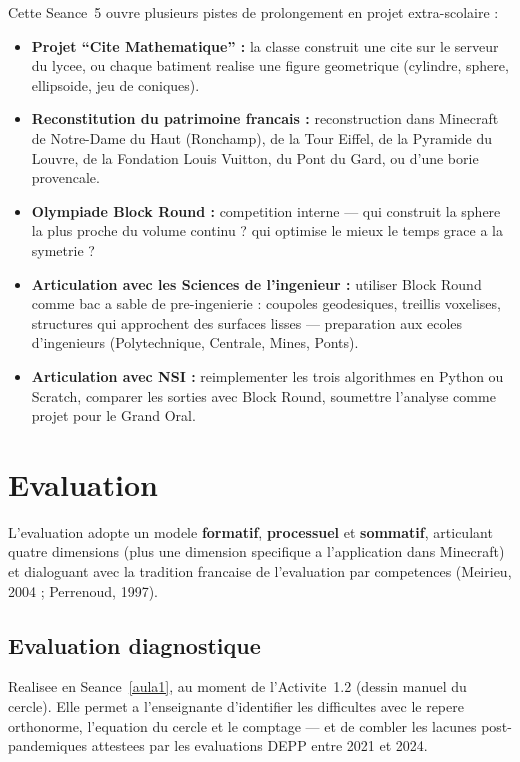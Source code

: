 \documentclass[12pt,a4paper]{scrartcl}
\newcommand{\acc}[1]{\textcolor{accent}{\textbf{#1}}}
\begin{document}
\begin{minecraft}
Cette Seance~5 ouvre plusieurs pistes de prolongement en projet extra-scolaire :
\begin{itemize}[leftmargin=1.3em,itemsep=0.15em,topsep=0.3em,nosep]
  \item \textbf{Projet \enquote{Cite Mathematique} :} la classe construit une cite sur le serveur du lycee, ou chaque batiment realise une figure geometrique (cylindre, sphere, ellipsoide, jeu de coniques).
  \item \textbf{Reconstitution du patrimoine francais :} reconstruction dans Minecraft de Notre-Dame du Haut (Ronchamp), de la Tour Eiffel, de la Pyramide du Louvre, de la Fondation Louis Vuitton, du Pont du Gard, ou d'une borie provencale.
  \item \textbf{Olympiade Block Round :} competition interne --- qui construit la sphere la plus proche du volume continu ? qui optimise le mieux le temps grace a la symetrie ?
  \item \textbf{Articulation avec les Sciences de l'ingenieur :} utiliser Block Round comme bac a sable de pre-ingenierie : coupoles geodesiques, treillis voxelises, structures qui approchent des surfaces lisses --- preparation aux ecoles d'ingenieurs (Polytechnique, Centrale, Mines, Ponts).
  \item \textbf{Articulation avec NSI :} reimplementer les trois algorithmes en Python ou Scratch, comparer les sorties avec Block Round, soumettre l'analyse comme projet pour le Grand Oral.
\end{itemize}
\end{minecraft}


\section{Evaluation}\label{sec:avaliacao}

L'evaluation adopte un modele \acc{formatif}, \acc{processuel} et \acc{sommatif}, articulant quatre dimensions (plus une dimension specifique a l'application dans Minecraft) et dialoguant avec la tradition francaise de l'evaluation par competences (Meirieu, 2004 ; Perrenoud, 1997).

\subsection{Evaluation diagnostique}
Realisee en Seance~\ref{aula1}, au moment de l'Activite~1.2 (dessin manuel du cercle). Elle permet a l'enseignant\textperiodcentered e d'identifier les difficultes avec le repere orthonorme, l'equation du cercle et le comptage --- et de combler les lacunes post-pandemiques attestees par les evaluations DEPP entre 2021 et 2024.
\end{document}
